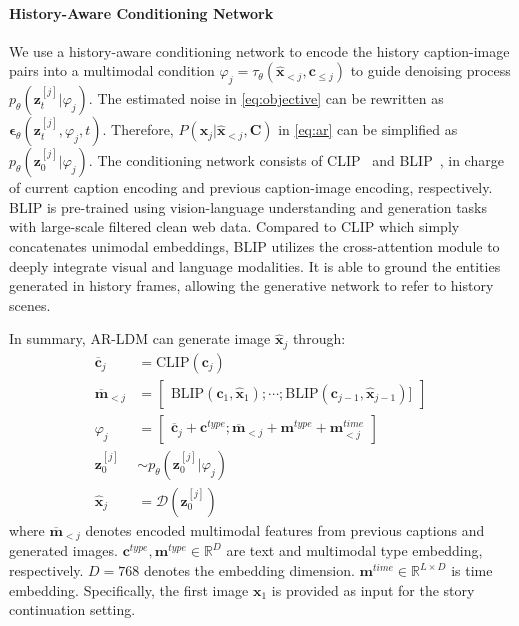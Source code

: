 \documentclass[10pt,twocolumn,letterpaper]{article}
\begin{document}
\paragraph{History-Aware Conditioning Network}
We use a history-aware conditioning network to encode the history caption-image pairs into a multimodal condition $\varphi_j = \tau_{\theta}(\hat{\mathbf{x}}_{<j}, \mathbf{c}_{\leq j})$ to guide denoising process $p_\theta(\mathbf{z}_{t}^{[j]} \vert \varphi_j)$. The estimated noise in \cref{eq:objective} can be rewritten as $\boldsymbol{\epsilon}_\theta(\mathbf{z}_t^{[j]}, \varphi_j, t)$. Therefore, $P(\mathbf{x}_j \vert \hat{\mathbf{x}}_{<j}, \mathbf{C})$ in \cref{eq:ar} can be simplified as $p_\theta(\mathbf{z}_{0}^{[j]} \vert \varphi_j)$. The conditioning network consists of CLIP~\cite{clip} and BLIP~\cite{blip}, in charge of current caption encoding and previous caption-image encoding, respectively. BLIP is pre-trained using vision-language understanding and generation tasks with large-scale filtered clean web data. Compared to CLIP which simply concatenates unimodal embeddings, BLIP utilizes the cross-attention module to deeply integrate visual and language modalities. It is able to ground the entities generated in history frames, allowing the generative network to refer to history scenes.

In summary, AR-LDM can generate image $\hat{\mathbf{x}}_{j}$ through:
\begin{equation}
\begin{aligned}
    \overline{\mathbf{c}}_j &= \mathrm{CLIP}(\mathbf{c}_j)\\
    \overline{\mathbf{m}}_{<j} &= 
    \begin{bmatrix}
    \mathrm{BLIP}(\mathbf{c}_1, \hat{\mathbf{x}}_{1}); \cdots; \mathrm{BLIP}(\mathbf{c}_{j-1}, \hat{\mathbf{x}}_{j-1})]
    \end{bmatrix}\\
    \varphi_j &= 
    \begin{bmatrix}
        \overline{\mathbf{c}}_j+\mathbf{c}^{type}; \overline{\mathbf{m}}_{<j}+\mathbf{m}^{type}+\mathbf{m}_{<j}^{time}
    \end{bmatrix}\\
    \mathbf{z}^{[j]}_0 &\sim p_\theta(\mathbf{z}^{[j]}_{0} \vert \varphi_j)\\
    \hat{\mathbf{x}}_{j} &= \mathcal{D}(\mathbf{z}^{[j]}_0)
\end{aligned}
\end{equation}
where $\overline{\mathbf{m}}_{<j}$ denotes encoded multimodal features from previous captions and generated images. $\mathbf{c}^{type}, \mathbf{m}^{type} \in \mathbb{R}^{D}$ are text and multimodal type embedding, respectively. $D=768$ denotes the embedding dimension. $\mathbf{m}^{time} \in \mathbb{R}^{L\times D}$ is time embedding. Specifically, the first image $\mathbf{x}_1$ is provided as input for the story continuation setting.
\end{document}
